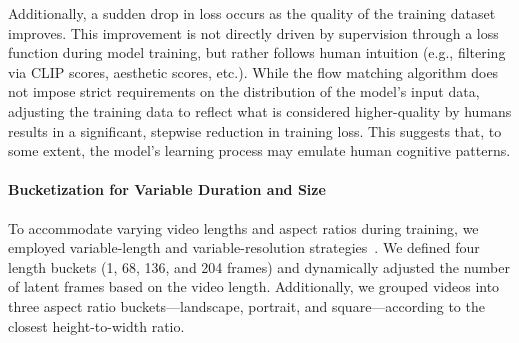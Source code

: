 Additionally, a sudden drop in loss occurs as the quality of the training dataset improves. This improvement is not directly driven by supervision through a loss function during model training, but rather follows human intuition (e.g., filtering via CLIP scores, aesthetic scores, etc.). While the flow matching algorithm does not impose strict requirements on the distribution of the model’s input data, adjusting the training data to reflect what is considered higher-quality by humans results in a significant, stepwise reduction in training loss. This suggests that, to some extent, the model’s learning process may emulate human cognitive patterns.


\paragraph{Bucketization for Variable Duration and Size}

To accommodate varying video lengths and aspect ratios during training, we employed variable-length and variable-resolution strategies~\cite{chen2023pixartalphafasttrainingdiffusion, opensora}. We defined four length buckets (1, 68, 136, and 204 frames) and dynamically adjusted the number of latent frames based on the video length. Additionally, we grouped videos into three aspect ratio buckets—landscape, portrait, and square—according to the closest height-to-width ratio.



